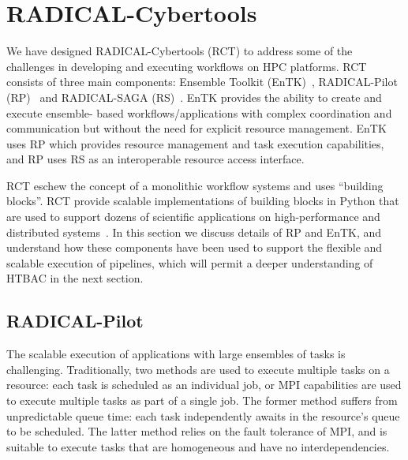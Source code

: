 \documentclass[conference]{IEEEtran}
\begin{document}
%

%
%
%
%
%
%
 

%
%
%
\section{RADICAL-Cybertools}\label{sec:4}
%

We have designed RADICAL-Cybertools (RCT) to address some of the challenges
in developing and executing workflows on HPC platforms. RCT consists of three
main components: Ensemble Toolkit (EnTK)~\cite{balasubramanian2016ensemble},
RADICAL-Pilot (RP)~\cite{merzky2015radical} and RADICAL-SAGA
(RS)~\cite{saga-x}. EnTK provides the ability to create and execute ensemble-
based workflows/applications with complex coordination and communication but
without the need for explicit resource management. EnTK uses RP which
provides resource management and task execution capabilities, and RP uses RS
as an interoperable resource access  interface.

RCT eschew the concept of a monolithic workflow systems and uses ``building
blocks''. RCT provide scalable implementations of building blocks in Python
that are used to support dozens of scientific applications on high-performance
and distributed systems~\cite{turilli2016analysis, angius2017converging,
treikalis2016repex, balasubramanian2016ensemble, balasubramanian2016extasy}. 
In this section we discuss details of RP and EnTK, and understand how these 
components have been used to support the flexible and scalable execution of 
pipelines, which will permit a deeper understanding of HTBAC in the next 
section.


%
%

%
%

\subsection{RADICAL-Pilot}

The scalable execution of applications with large ensembles of tasks is
challenging. Traditionally, two methods are used to execute multiple tasks on
a resource: each task is scheduled as an individual job, or MPI capabilities
are used to execute multiple tasks as part of a single job. The former method
suffers from unpredictable queue time: each task independently awaits in the
resource's queue to be scheduled. The latter method relies on the fault
tolerance of MPI, and is suitable to execute tasks that are homogeneous and
have no interdependencies.
\end{document}
